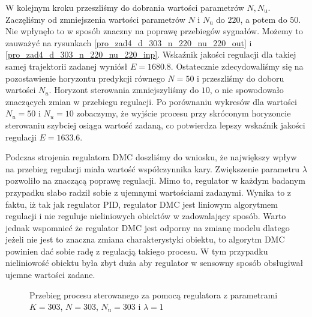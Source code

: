 W kolejnym kroku przeszliśmy do dobrania wartości parametrów $ N, N_{\mathrm{u}}$.
Zaczęliśmy od zmniejszenia wartości parametrów $N$ i $N_{\mathrm{u}}$ do $\num{220}$, 
a potem do $\num{50}$. Nie wpłynęło to w sposób znaczny na poprawę przebiegów sygnałów. 
Możemy to zauważyć na rysunkach \ref{pro_zad4_d_303_n_220_nu_220_out} i 
\ref{pro_zad4_d_303_n_220_nu_220_inp}. Wskaźnik jakości regulacji dla takiej samej trajektorii zadanej wyniósł 
$E = \num{1680,8}$. Ostatecznie zdecydowaliśmy się na pozostawienie
horyzontu predykcji równego $N = \num{50}$ i 
przeszliśmy do doboru wartości $N_{u}$. Horyzont sterowania zmniejszyliśmy do $\num{10}$, 
o nie spowodowało znaczących zmian w przebiegu regulacji. 
Po porównaniu wykresów dla wartości $N_{u} = 50$ i $N_{u} = 10$ 
zobaczymy, że wyjście procesu przy skróconym horyzoncie sterowaniu szybciej osiąga wartość zadaną, co potwierdza
lepszy wskaźnik jakości regulacji $E = \num{1633,6}$.

Podczas strojenia regulatora DMC doszliśmy do wniosku, że największy wpływ na przebieg regulacji miała wartość 
współczynnika kary. Zwiększenie parametru $\lambda$ pozwoliło na znaczącą poprawę regulacji. Mimo to, regulator w
każdym badanym przypadku słabo radził sobie z ujemnymi wartościami zadanymi. Wynika to z faktu, iż tak jak regulator
PID, regulator DMC jest liniowym algorytmem regulacji i nie reguluje nieliniowych obiektów w zadowalający sposób. 
Warto jednak wspomnieć że regulator DMC jest odporny na zmianę modelu dlatego jeżeli nie jest to znaczna zmiana 
charakterystyki obiektu, to algorytm DMC powinien dać sobie radę z regulacją takiego procesu. W tym przypadku nieliniowość
obiektu była zbyt duża aby regulator w sensowny sposób obsługiwał ujemne wartości zadane. 

\begin{figure}[t]
    \centering
    \caption{Przebieg procesu sterowanego za pomocą regulatora z parametrami $K = \num{303}$, $N = \num{303}$, $N_{\mathrm{u}} = \num{303}$ i $\lambda = 1$}
    \label{pro_zad4_d_303_n_303_nu_303_out}
\end{figure}

